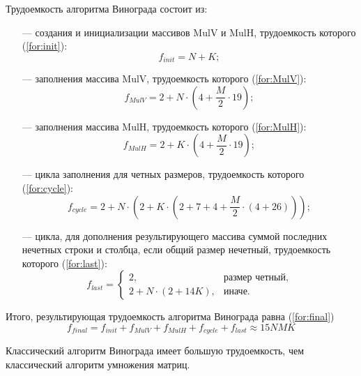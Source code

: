 Трудоемкость алгоритма Винограда состоит из:
\begin{itemize}
	\item[---] создания и инициализации массивов MulV и MulH, трудоемкость которого (\ref{for:init}):
	\begin{equation}
		\label{for:init}
		f_{init} = N + K;
	\end{equation}
	
	\item[---] заполнения массива MulV, трудоемкость которого (\ref{for:MulV}):
	\begin{equation}
		\label{for:MulV}
		f_{MulV} = 2 + N \cdot (4 + \frac{M}{2} \cdot 19);
	\end{equation}
	
	\item[---] заполнения массива MulH, трудоемкость которого (\ref{for:MulH}):
	\begin{equation}
		\label{for:MulH}
		f_{MulH} = 2 + K \cdot (4 + \frac{M}{2} \cdot 19);
	\end{equation}
	
	\item[---] цикла заполнения для четных размеров, трудоемкость которого (\ref{for:cycle}):
	\begin{equation}
		\label{for:cycle}
		f_{cycle} = 2 + N \cdot (2 + K \cdot (2 + 7 + 4 + \frac{M}{2} \cdot (4 + 26)));		
	\end{equation}
	
	\item[---] цикла, для дополнения результирующего массива суммой последних нечетных строки и столбца, если общий размер нечетный, трудоемкость которого (\ref{for:last}):
	\begin{equation}
		\label{for:last}
		f_{last} = \begin{cases}
			2, & \text{размер четный,}\\
			2 + N \cdot (2 + 14K), & \text{иначе.}
		\end{cases}
	\end{equation}
\end{itemize}

Итого, результирующая трудоемкость алгоритма Винограда равна (\ref{for:final})
\begin{equation}
	\label{for:final}
	f_{final} = f_{init} + f_{MulV} + f_{MulH} + f_{cycle} + f_{last} \approx 15NMK
\end{equation}

Классический алгоритм Винограда имеет большую трудоемкость, чем классический алгоритм умножения матриц.

